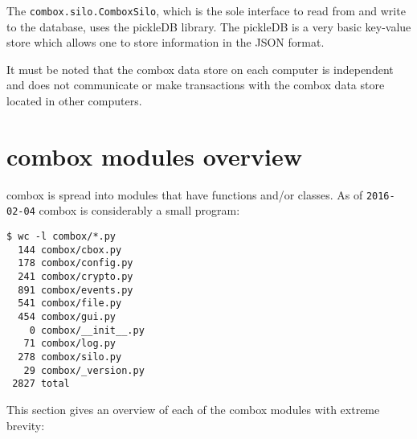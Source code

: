 The \verb+combox.silo.ComboxSilo+, which is the sole interface to read
from and write to the database, uses the pickleDB
library\cite{pylib:pickledb}. The pickleDB is a very basic key-value
store which allows one to store information in the JSON format.

It must be noted that the combox data store on each computer is
independent and does not communicate or make transactions with the
combox data store located in other computers.

\section{combox modules overview}

combox is spread into modules that have functions and/or classes. As
of \verb+2016-02-04+ combox is considerably a small program:

\begin{verbatim}
$ wc -l combox/*.py
  144 combox/cbox.py
  178 combox/config.py
  241 combox/crypto.py
  891 combox/events.py
  541 combox/file.py
  454 combox/gui.py
    0 combox/__init__.py
   71 combox/log.py
  278 combox/silo.py
   29 combox/_version.py
 2827 total
\end{verbatim}

This section gives an overview of each of the combox modules with
extreme brevity:

